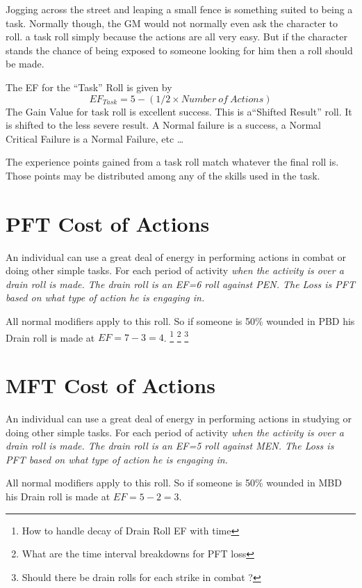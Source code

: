Jogging across the street and leaping a small fence is something suited to being 
a task. Normally though, the GM would not normally even ask the character to roll. 
a task roll simply because the actions are all very easy. But if the character 
stands the chance of being exposed to someone looking for him then a roll should
be made. 

The EF for the ``Task'' Roll 
is given by \[ EF_{Task} = 5 - ( 1/2 \times {Number\ of\ Actions }) \] 
The Gain Value for task roll is excellent success. This is a``Shifted Result''
roll. It is shifted to the less severe result. A Normal failure is a success,
a Normal Critical Failure is a Normal Failure, etc \dots

The experience points gained from a task roll match whatever the
final roll is. Those points may be distributed among any of the skills used
in the task.

\section{PFT Cost of Actions}

An individual can use a great deal of energy in performing actions in combat or
doing other simple tasks. For each period of activity \em{when the activity is over}
a drain roll is made. The drain roll is an EF=6 roll against PEN. The Loss is 
PFT based on what type of action he is engaging in.

All normal modifiers apply to this roll. So if someone is 50\% wounded in
PBD his Drain roll is made at \( EF = 7 - 3 = 4 \).  
\footnote{How to handle decay of Drain Roll EF with time}
\footnote{What are the time interval breakdowns for PFT loss} 
\footnote{Should there be drain rolls for each strike in combat ?}



\section{MFT Cost of Actions}

An individual can use a great deal of energy in performing actions in studying or
doing other simple tasks. For each period of activity \em when the activity is over
a drain roll is made. The drain roll is an EF=5 roll against MEN. The Loss is 
PFT based on what type of action he is engaging in.

All normal modifiers apply to this roll. So if someone is 50\% wounded in
MBD his Drain roll is made at \( EF = 5 - 2 = 3 \).  

